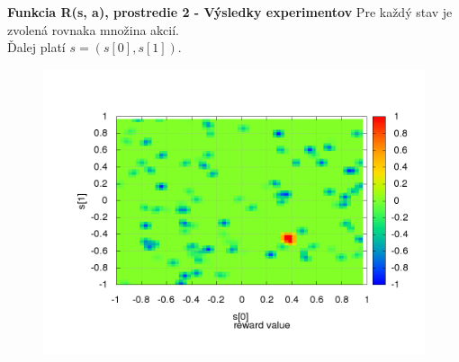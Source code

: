 \documentclass[xcolor=dvipsnames]{beamer}
\begin{document}
\begin{frame}{\bf Funkcia R(s, a), prostredie 2 - Výsledky experimentov}
Pre každý stav je zvolená rovnaka množina akcií. \\
Ďalej platí $s = (s[0], s[1])$.

\begin{figure}[!htb]
\centering
\includegraphics[scale=.35]{../../results_q_learning/map_2/reward_value_surface.png}
\end{figure}

\end{frame}
\end{document}
